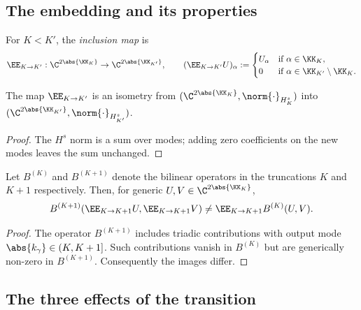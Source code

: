 \subsection{The embedding and its properties}
\label{part-2:ssec:embedding}

\begin{definition}[Embedding]\label{part-2:def:embedding}
For $K<K'$, the \emph{inclusion map} is
\begin{equation}\label{part-2:eq:embedding}
\EE_{K\to K'} : \C^{2\abs{\KK_K}} \to \C^{2\abs{\KK_{K'}}},
\qquad
(\EE_{K\to K'} U)_\alpha := 
\begin{cases}
U_\alpha & \text{if }\alpha\in\KK_K,\\
0 & \text{if }\alpha\in\KK_{K'}\setminus\KK_K.
\end{cases}
\end{equation}
\end{definition}

\begin{proposition}\label{part-2:prop:iso-embed}
The map $\EE_{K\to K'}$ is an isometry from $(\C^{2\abs{\KK_K}}, 
\norm{\cdot}_{H^s_K})$ into $(\C^{2\abs{\KK_{K'}}}, 
\norm{\cdot}_{H^s_{K'}})$.
\end{proposition}

\begin{proof}
The $H^s$ norm is a sum over modes; adding zero coefficients on the 
new modes leaves the sum unchanged.
\end{proof}

\begin{proposition}\label{part-2:prop:non-comm}
Let $B^{(K)}$ and $B^{(K+1)}$ denote the bilinear operators in the 
truncations $K$ and $K+1$ respectively. Then, for generic 
$U,V\in\C^{2\abs{\KK_K}}$,
\begin{equation}\label{part-2:eq:non-comm}
B^{(K+1)}(\EE_{K\to K+1}U, \EE_{K\to K+1}V) 
\neq \EE_{K\to K+1} B^{(K)}(U,V).
\end{equation}
\end{proposition}

\begin{proof}
The operator $B^{(K+1)}$ includes triadic contributions with output 
mode $\abs{k_\gamma}\in(K,K+1]$. Such contributions vanish in 
$B^{(K)}$ but are generically non-zero in $B^{(K+1)}$. Consequently 
the images differ.
\end{proof}

\subsection{The three effects of the transition}
\label{part-2:ssec:three-effects}

